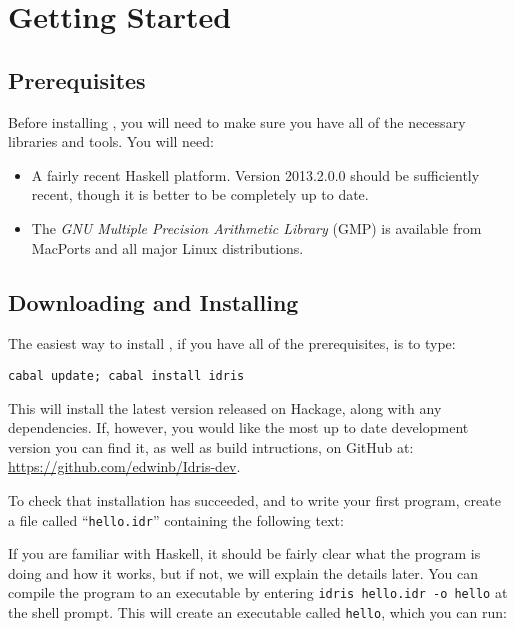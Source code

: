 \section{Getting Started}

\subsection{Prerequisites}

Before installing \Idris{}, you will need to make sure you have all of the necessary libraries and tools.
You will need:

\begin{itemize}
\item A fairly recent Haskell platform. Version 2013.2.0.0
should be sufficiently recent, though it is better to be completely up to
date.
\item The \emph{GNU Multiple Precision Arithmetic Library} (GMP) is available from MacPorts and all major Linux distributions.
\end{itemize}

\subsection{Downloading and Installing}

The easiest way to install \Idris{}, if you have all of the prerequisites, is to type:

\begin{lstlisting}[style=stdout]
cabal update; cabal install idris
\end{lstlisting}

\noindent
This will install the latest version released on Hackage, along with any dependencies.
If, however, you would like the most up to date development version you can find it, as well as build intructions, on GitHub at: \url{https://github.com/edwinb/Idris-dev}.

To check that installation has succeeded, and to write your first \Idris{} program, create a file called ``\texttt{hello.idr}'' containing the following text:


\noindent
If you are familiar with Haskell, it should be fairly clear what the program is doing and how it works, but if not, we will explain the details later.
You can compile the program to an executable by entering \texttt{idris hello.idr -o hello} at the shell prompt.
This will create an executable called \texttt{hello}, which you can run:

